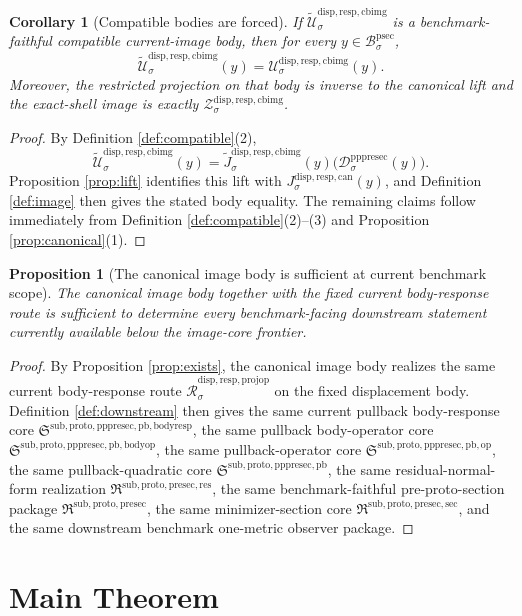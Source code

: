\documentclass[11pt]{article}
\newcommand{\ProtoSectionBody}[1]{\mathcal B_{#1}^{\mathrm{psec}}}
\newcommand{\PrePreProtoSectionPullbackCore}{\mathfrak S^{\mathrm{sub,proto,pppresec,pb}}}
\newcommand{\PrePreProtoSectionResidualBody}[1]{\mathcal D_{#1}^{\mathrm{pppresec}}}
\newcommand{\PullbackOperatorCore}{\mathfrak S^{\mathrm{sub,proto,pppresec,pb,op}}}
\newcommand{\PullbackBodyOperatorCore}{\mathfrak S^{\mathrm{sub,proto,pppresec,pb,bodyop}}}
\newcommand{\PullbackBodyResponseCore}{\mathfrak S^{\mathrm{sub,proto,pppresec,pb,bodyresp}}}
\newcommand{\PreProtoSectionResidualPackage}{\mathfrak R^{\mathrm{sub,proto,presec,res}}}
\newcommand{\PreProtoSectionPackage}{\mathfrak R^{\mathrm{sub,proto,presec}}}
\newcommand{\PreProtoSectionMinSectionCore}{\mathfrak R^{\mathrm{sub,proto,presec,sec}}}
\newcommand{\CanonicalLift}[1]{J_{#1}^{\mathrm{disp,resp,can}}}
\newcommand{\CoreForcedBodyResponse}[1]{\widehat{\mathscr R}_{#1}^{\mathrm{disp,resp,projop}}}
\newcommand{\CanonicalImageBody}[1]{\mathcal U_{#1}^{\mathrm{disp,resp,cbimg}}}
\newcommand{\CanonicalImageShell}[1]{\mathcal Z_{#1}^{\mathrm{disp,resp,cbimg}}}
\newcommand{\CompatibleImageBody}[1]{\widetilde{\mathcal U}_{#1}^{\mathrm{disp,resp,cbimg}}}
\newcommand{\CompatibleImageLift}[1]{\widetilde J_{#1}^{\mathrm{disp,resp,cbimg}}}
\newtheorem{proposition}{Proposition}
\newtheorem{corollary}{Corollary}
\begin{document}
\begin{corollary}[Compatible bodies are forced]
\label{cor:body}
If \(\CompatibleImageBody{\sigma}\) is a benchmark-faithful compatible current-image body, then for every \(y\in\ProtoSectionBody{\sigma}\),
\[
\CompatibleImageBody{\sigma}(y)
=
\CanonicalImageBody{\sigma}(y).
\]
Moreover, the restricted projection on that body is inverse to the canonical lift and the exact-shell image is exactly \(\CanonicalImageShell{\sigma}\).
\end{corollary}

\begin{proof}
By Definition \ref{def:compatible}(2),
\[
\CompatibleImageBody{\sigma}(y)
=
\CompatibleImageLift{\sigma}(y)\bigl(\PrePreProtoSectionResidualBody{\sigma}(y)\bigr).
\]
Proposition \ref{prop:lift} identifies this lift with \(\CanonicalLift{\sigma}(y)\), and Definition \ref{def:image} then gives the stated body equality. The remaining claims follow immediately from Definition \ref{def:compatible}(2)--(3) and Proposition \ref{prop:canonical}(1).
\end{proof}

\begin{proposition}[The canonical image body is sufficient at current benchmark scope]
\label{prop:sufficient}
The canonical image body together with the fixed current body-response route is sufficient to determine every benchmark-facing downstream statement currently available below the image-core frontier.
\end{proposition}

\begin{proof}
By Proposition \ref{prop:exists}, the canonical image body realizes the same current body-response route \(\CoreForcedBodyResponse{\sigma}\) on the fixed displacement body. Definition \ref{def:downstream} then gives the same current pullback body-response core \(\PullbackBodyResponseCore\), the same pullback body-operator core \(\PullbackBodyOperatorCore\), the same pullback-operator core \(\PullbackOperatorCore\), the same pullback-quadratic core \(\PrePreProtoSectionPullbackCore\), the same residual-normal-form realization \(\PreProtoSectionResidualPackage\), the same benchmark-faithful pre-proto-section package \(\PreProtoSectionPackage\), the same minimizer-section core \(\PreProtoSectionMinSectionCore\), and the same downstream benchmark one-metric observer package.
\end{proof}

\section{Main Theorem}
\end{document}
